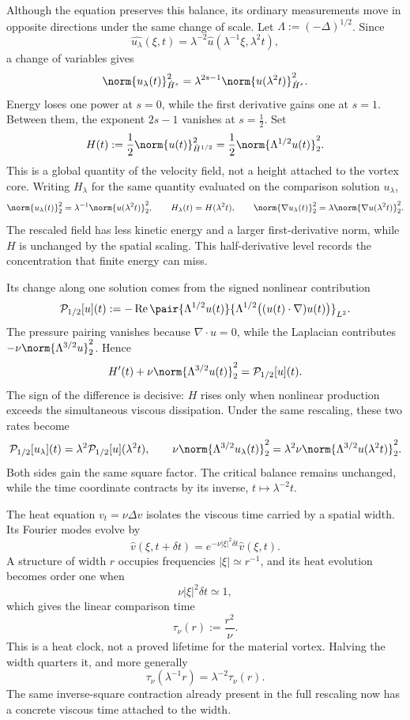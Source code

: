 Although the equation preserves this balance, its ordinary measurements move in opposite directions under the same change of scale. Let \(\Lambda:=(-\Delta)^{1/2}\). Since
\[
  \widehat{u_\lambda}(\xi,t)
  =
  \lambda^{-2}\widehat u(\lambda^{-1}\xi,\lambda^2t),
\]
a change of variables gives
\[
  \norm{u_\lambda(t)}_{\dot H^s}^2
  =
  \lambda^{2s-1}
  \norm{u(\lambda^2t)}_{\dot H^s}^2.
\]
Energy loses one power at \(s=0\), while the first derivative gains one at \(s=1\). Between them, the exponent \(2s-1\) vanishes at \(s=\tfrac12\). Set
\[
  H(t)
  :=
  \frac12\norm{u(t)}_{\dot H^{1/2}}^2
  =
  \frac12\norm{\Lambda^{1/2}u(t)}_2^2.
\]
This is a global quantity of the velocity field, not a height attached to the vortex core. Writing \(H_\lambda\) for the same quantity evaluated on the comparison solution \(u_\lambda\),
\[
  \norm{u_\lambda(t)}_2^2
  =
  \lambda^{-1}\norm{u(\lambda^2t)}_2^2,
  \qquad
  H_\lambda(t)=H(\lambda^2t),
  \qquad
  \norm{\nabla u_\lambda(t)}_2^2
  =
  \lambda\norm{\nabla u(\lambda^2t)}_2^2.
\]
The rescaled field has less kinetic energy and a larger first-derivative norm, while \(H\) is unchanged by the spatial scaling. This half-derivative level records the concentration that finite energy can miss.


Its change along one solution comes from the signed nonlinear contribution
\[
  \mathcal P_{1/2}[u](t)
  :=
  -\operatorname{Re}
  \pair
    {\Lambda^{1/2}u(t)}
    {\Lambda^{1/2}\bigl((u(t)\cdot\nabla)u(t)\bigr)}_{L^2}.
\]
The pressure pairing vanishes because \(\nabla\cdot u=0\), while the Laplacian contributes \(-\nu\norm{\Lambda^{3/2}u}_2^2\). Hence
\[
  H'(t)
  +
  \nu\norm{\Lambda^{3/2}u(t)}_2^2
  =
  \mathcal P_{1/2}[u](t).
\]
The sign of the difference is decisive: \(H\) rises only when nonlinear production exceeds the simultaneous viscous dissipation. Under the same rescaling, these two rates become
\[
  \mathcal P_{1/2}[u_\lambda](t)
  =
  \lambda^2\mathcal P_{1/2}[u](\lambda^2t),
  \qquad
  \nu\norm{\Lambda^{3/2}u_\lambda(t)}_2^2
  =
  \lambda^2\nu\norm{\Lambda^{3/2}u(\lambda^2t)}_2^2.
\]
Both sides gain the same square factor. The critical balance remains unchanged, while the time coordinate contracts by its inverse, \(t\mapsto\lambda^{-2}t\).


The heat equation \(v_t=\nu\Delta v\) isolates the viscous time carried by a spatial width. Its Fourier modes evolve by
\[
  \widehat v(\xi,t+\delta t)
  =
  e^{-\nu|\xi|^2\delta t}\widehat v(\xi,t).
\]
A structure of width \(r\) occupies frequencies \(|\xi|\simeq r^{-1}\), and its heat evolution becomes order one when
\[
  \nu|\xi|^2\delta t\simeq1,
\]
which gives the linear comparison time
\[
  \tau_\nu(r)
  :=
  \frac{r^2}{\nu}.
\]
This is a heat clock, not a proved lifetime for the material vortex. Halving the width quarters it, and more generally
\[
  \tau_\nu(\lambda^{-1}r)
  =
  \lambda^{-2}\tau_\nu(r).
\]
The same inverse-square contraction already present in the full \NavierStokes{} rescaling now has a concrete viscous time attached to the width.

